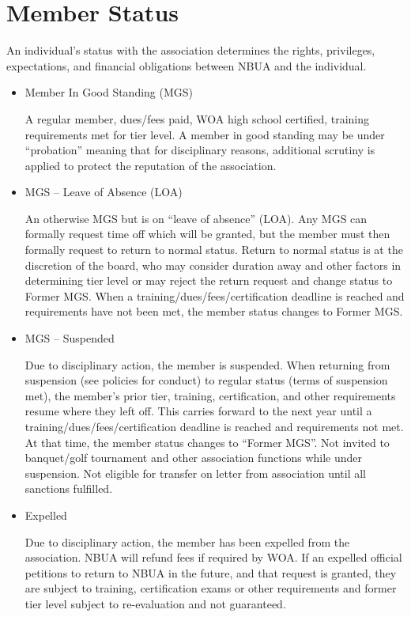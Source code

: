 \documentclass[letterpaper,11pt,colorlinks=true,allcolors=blue]{article}
\begin{document}
\newpage
\section{Member Status}

An individual's status with the association determines the rights, privileges, expectations, and financial obligations between NBUA and the individual.

\begin{itemize}

\item Member In Good Standing (MGS)

A regular member, dues/fees paid, WOA high school certified, training requirements met for tier level.  A member in good standing may be under “probation” meaning that for disciplinary reasons, additional scrutiny is applied to protect the reputation of the association.

\item MGS – Leave of Absence (LOA)

An otherwise MGS but is on “leave of absence” (LOA).  Any MGS can formally request time off which will be granted, but the member must then formally request to return to normal status.  Return to normal status is at the discretion of the board, who may consider duration away and other factors in determining tier level or may reject the return request and change status to Former MGS. When a training/dues/fees/certification deadline is reached and requirements have not been met, the member status changes to Former MGS.

\item MGS – Suspended 

Due to disciplinary action, the member is suspended.  When returning from suspension (see policies for conduct) to regular status (terms of suspension met), the member’s prior tier, training, certification, and other requirements resume where they left off.  This carries forward to the next year until a training/dues/fees/certification deadline is reached and requirements not met.  At that time, the member status changes to “Former MGS”.  Not invited to banquet/golf tournament and other association functions while under suspension.  Not eligible for transfer on letter from association until all sanctions fulfilled.

\item Expelled

Due to disciplinary action, the member has been expelled from the association.  NBUA will refund fees if required by WOA.  If an expelled official petitions to return to NBUA in the future, and that request is granted, they are subject to training, certification exams or other requirements and former tier level subject to re-evaluation and not guaranteed.


\end{itemize}
\end{document}
